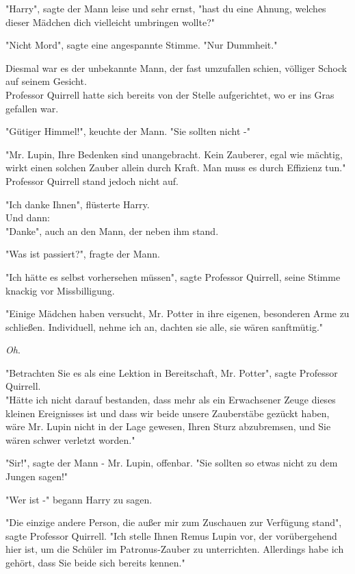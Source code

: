 {"Harry", sagte der Mann leise und sehr ernst, "hast du eine Ahnung, welches dieser Mädchen dich vielleicht umbringen wollte?"

"Nicht Mord", sagte eine angespannte Stimme. "Nur Dummheit."

Diesmal war es der unbekannte Mann, der fast umzufallen schien, völliger Schock auf seinem Gesicht.\\ Professor Quirrell hatte sich bereits von der Stelle aufgerichtet, wo er ins Gras gefallen war.

"Gütiger Himmel!", keuchte der Mann. "Sie sollten nicht -"

"Mr. Lupin, Ihre Bedenken sind unangebracht. Kein Zauberer, egal wie mächtig, wirkt einen solchen Zauber allein durch Kraft. Man muss es durch Effizienz tun."\\ Professor Quirrell stand jedoch nicht auf.

"Ich danke Ihnen", flüsterte Harry.\\ Und dann:\\ "Danke", auch an den Mann, der neben ihm stand.

"Was ist passiert?", fragte der Mann.

"Ich hätte es selbst vorhersehen müssen", sagte Professor Quirrell, seine Stimme knackig vor Missbilligung.

"Einige Mädchen haben versucht, Mr. Potter in ihre eigenen, besonderen Arme zu schließen. Individuell, nehme ich an, dachten sie alle, sie wären sanftmütig."

\emph{Oh}.

"Betrachten Sie es als eine Lektion in Bereitschaft, Mr. Potter", sagte Professor Quirrell.\\ "Hätte ich nicht darauf bestanden, dass mehr als ein Erwachsener Zeuge dieses kleinen Ereignisses ist und dass wir beide unsere Zauberstäbe gezückt haben, wäre Mr. Lupin nicht in der Lage gewesen, Ihren Sturz abzubremsen, und Sie wären schwer verletzt worden."

"Sir!", sagte der Mann - Mr. Lupin, offenbar. "Sie sollten so etwas nicht zu dem Jungen sagen!"

"Wer ist -" begann Harry zu sagen.

"Die einzige andere Person, die außer mir zum Zuschauen zur Verfügung stand", sagte Professor Quirrell. "Ich stelle Ihnen Remus Lupin vor, der vorübergehend hier ist, um die Schüler im Patronus-Zauber zu unterrichten. Allerdings habe ich gehört, dass Sie beide sich bereits kennen."

}
